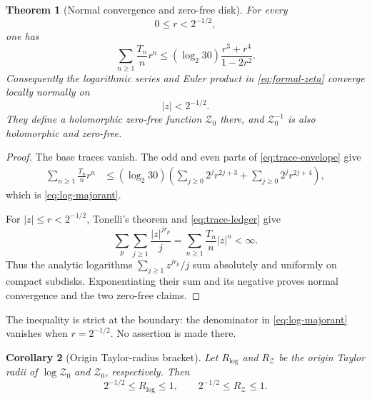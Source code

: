 \documentclass[11pt]{article}
\numberwithin{equation}{section}
\newtheorem{theorem}{Theorem}[section]
\newtheorem{corollary}[theorem]{Corollary}
\theoremstyle{remark}
\newcommand{\cZ}{\mathcal Z}
\begin{document}
\begin{theorem}[Normal convergence and zero-free disk]
\label{thm:analytic-disk}
For every
\begin{equation}
 0\le r<2^{-1/2},
 \label{eq:strict-radius}
\end{equation}
one has
\begin{equation}
 \sum_{n\ge1}\frac{T_n}{n}r^n
 \le
 (\log_2 30)\frac{r^3+r^4}{1-2r^2}.
 \label{eq:log-majorant}
\end{equation}
Consequently the logarithmic series and Euler product in
\eqref{eq:formal-zeta} converge locally normally on
\begin{equation}
 |z|<2^{-1/2}.
 \label{eq:analytic-disk}
\end{equation}
They define a holomorphic zero-free function \(\cZ_0\) there, and
\(\cZ_0^{-1}\) is also holomorphic and zero-free.
\end{theorem}

\begin{proof}
The base traces vanish.  The odd and even parts of
\eqref{eq:trace-envelope} give
\begin{align*}
 \sum_{n\ge1}\frac{T_n}{n}r^n
 &\le(\log_2 30)
 \left(
  \sum_{j\ge0}2^jr^{2j+3}
  +\sum_{j\ge0}2^jr^{2j+4}
 \right),
\end{align*}
which is \eqref{eq:log-majorant}.

For \(|z|\le r<2^{-1/2}\), Tonelli's theorem and
\eqref{eq:trace-ledger} give
\begin{equation}
 \sum_p\sum_{j\ge1}\frac{|z|^{jr_p}}j
 =\sum_{n\ge1}\frac{T_n}{n}|z|^n<\infty.
 \label{eq:tonelli-log}
\end{equation}
Thus the analytic logarithms
\(
\sum_{j\ge1}z^{jr_p}/j
\)
sum absolutely and uniformly on compact subdisks.  Exponentiating their sum
and its negative proves normal convergence and the two zero-free claims.
\end{proof}

The inequality is strict at the boundary: the denominator in
\eqref{eq:log-majorant} vanishes when \(r=2^{-1/2}\).  No assertion is made
there.

\begin{corollary}[Origin Taylor-radius bracket]
\label{cor:radius-bracket}
Let \(R_{\log}\) and \(R_{\cZ}\) be the origin Taylor radii of
\(\log\cZ_0\) and \(\cZ_0\), respectively.  Then
\begin{equation}
 2^{-1/2}\le R_{\log}\le1,
 \qquad
 2^{-1/2}\le R_{\cZ}\le1.
 \label{eq:radius-bracket}
\end{equation}
\end{corollary}
\end{document}
